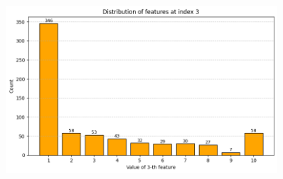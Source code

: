 \documentclass[polish,12pt,a4paper]{extarticle}
\begin{document}
\begin{figure}[h!]
    \begin{minipage}[b]{0.3\textwidth}
    \includegraphics[width=0.9\textwidth]{img/feature_3.png}
    \end{minipage}
\end{figure} \smallskip \\
\end{document}
